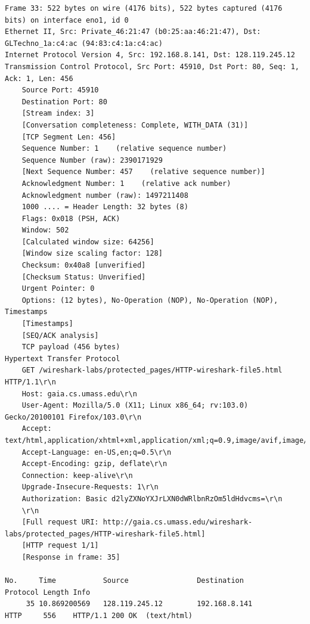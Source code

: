 \documentclass[a4paper,11pt,final]{report}
\begin{document}
\begin{lstlisting}[breaklines]
Frame 33: 522 bytes on wire (4176 bits), 522 bytes captured (4176 bits) on interface eno1, id 0
Ethernet II, Src: Private_46:21:47 (b0:25:aa:46:21:47), Dst: GLTechno_1a:c4:ac (94:83:c4:1a:c4:ac)
Internet Protocol Version 4, Src: 192.168.8.141, Dst: 128.119.245.12
Transmission Control Protocol, Src Port: 45910, Dst Port: 80, Seq: 1, Ack: 1, Len: 456
    Source Port: 45910
    Destination Port: 80
    [Stream index: 3]
    [Conversation completeness: Complete, WITH_DATA (31)]
    [TCP Segment Len: 456]
    Sequence Number: 1    (relative sequence number)
    Sequence Number (raw): 2390171929
    [Next Sequence Number: 457    (relative sequence number)]
    Acknowledgment Number: 1    (relative ack number)
    Acknowledgment number (raw): 1497211408
    1000 .... = Header Length: 32 bytes (8)
    Flags: 0x018 (PSH, ACK)
    Window: 502
    [Calculated window size: 64256]
    [Window size scaling factor: 128]
    Checksum: 0x40a8 [unverified]
    [Checksum Status: Unverified]
    Urgent Pointer: 0
    Options: (12 bytes), No-Operation (NOP), No-Operation (NOP), Timestamps
    [Timestamps]
    [SEQ/ACK analysis]
    TCP payload (456 bytes)
Hypertext Transfer Protocol
    GET /wireshark-labs/protected_pages/HTTP-wireshark-file5.html HTTP/1.1\r\n
    Host: gaia.cs.umass.edu\r\n
    User-Agent: Mozilla/5.0 (X11; Linux x86_64; rv:103.0) Gecko/20100101 Firefox/103.0\r\n
    Accept: text/html,application/xhtml+xml,application/xml;q=0.9,image/avif,image/webp,*/*;q=0.8\r\n
    Accept-Language: en-US,en;q=0.5\r\n
    Accept-Encoding: gzip, deflate\r\n
    Connection: keep-alive\r\n
    Upgrade-Insecure-Requests: 1\r\n
    Authorization: Basic d2lyZXNoYXJrLXN0dWRlbnRzOm5ldHdvcms=\r\n
    \r\n
    [Full request URI: http://gaia.cs.umass.edu/wireshark-labs/protected_pages/HTTP-wireshark-file5.html]
    [HTTP request 1/1]
    [Response in frame: 35]

No.     Time           Source                Destination           Protocol Length Info
     35 10.869200569   128.119.245.12        192.168.8.141         HTTP     556    HTTP/1.1 200 OK  (text/html)


\end{lstlisting}
\end{document}
